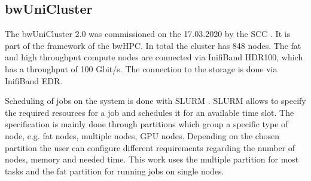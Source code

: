 \subsection{bwUniCluster}
\label{subsec:bw_uni_cluster}
The bwUniCluster 2.0 was commissioned on the 17.03.2020 by the \gls{SCC} \cite{haefner_kit_2020}.
It is part of the framework of the \gls{bwHPC}. In total the cluster has 848 nodes.
The fat and high throughput compute nodes are connected via InifiBand HDR100, which has a throughput of 100 Gbit/s.
The connection to the storage is done via InifiBand EDR.

Scheduling of jobs on the system is done with \gls{SLURM} \cite{yoo_slurm_2003}.
\gls{SLURM} allows to specify the required resources for a job and schedules it for an available time slot.
The specification is mainly done through partitions which group a specific type of node, e.g. fat nodes, multiple nodes, \gls{GPU} nodes.
Depending on the chosen partition the user can configure different requirements regarding the number of nodes, memory and needed time.
This work uses the multiple partition for most tasks and the fat partition for running jobs on single nodes.
